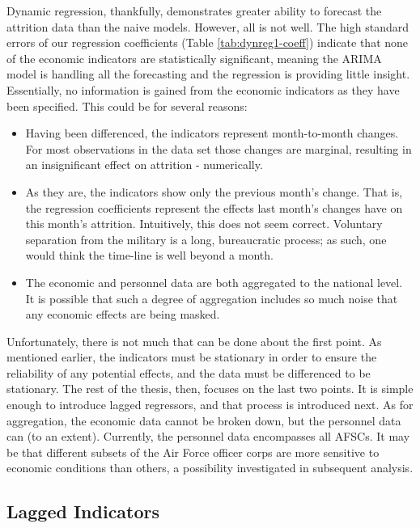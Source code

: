\documentclass[12pt,letterpaper,toc=flat,oneside]{report}
\theoremstyle{definition}
\theoremstyle{definition}
\theoremstyle{definition}
\theoremstyle{remark}
\begin{document}
Dynamic regression, thankfully, demonstrates greater ability to forecast
the attrition data than the naive models. However, all is not well. The
high standard errors of our regression coefficients (Table
\ref{tab:dynreg1-coeff}) indicate that none of the economic indicators
are statistically significant, meaning the ARIMA model is handling all
the forecasting and the regression is providing little insight.
Essentially, no information is gained from the economic indicators as
they have been specified. This could be for several reasons:

\begin{itemize}
\item
  Having been differenced, the indicators represent month-to-month
  changes. For most observations in the data set those changes are
  marginal, resulting in an insignificant effect on attrition -
  numerically.
\item
  As they are, the indicators show only the previous month's change.
  That is, the regression coefficients represent the effects last
  month's changes have on this month's attrition. Intuitively, this does
  not seem correct. Voluntary separation from the military is a long,
  bureaucratic process; as such, one would think the time-line is well
  beyond a month.
\item
  The economic and personnel data are both aggregated to the national
  level. It is possible that such a degree of aggregation includes so
  much noise that any economic effects are being masked.
\end{itemize}

Unfortunately, there is not much that can be done about the first point.
As mentioned earlier, the indicators must be stationary in order to
ensure the reliability of any potential effects, and the data must be
differenced to be stationary. The rest of the thesis, then, focuses on
the last two points. It is simple enough to introduce lagged regressors,
and that process is introduced next. As for aggregation, the economic
data cannot be broken down, but the personnel data can (to an extent).
Currently, the personnel data encompasses all AFSCs. It may be that
different subsets of the Air Force officer corps are more sensitive to
economic conditions than others, a possibility investigated in
subsequent analysis.

\hypertarget{lagged-indicators}{%
\subsection{Lagged Indicators}\label{lagged-indicators}}
\end{document}
